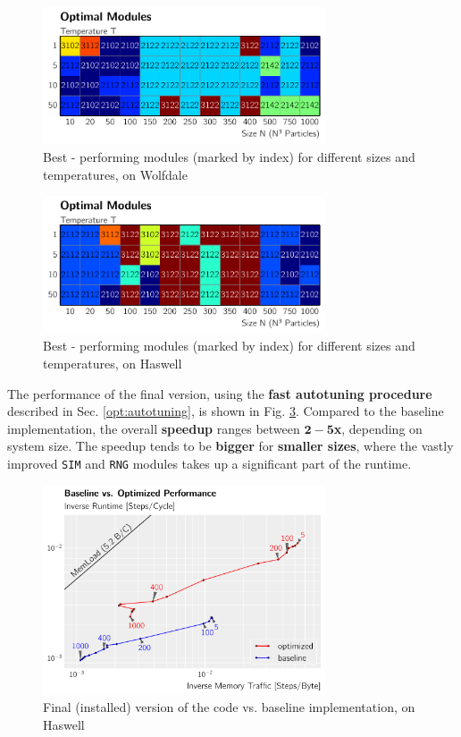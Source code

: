 \documentclass[letterpaper]{article}
\begin{document}
	\begin{figure}[h]\centering
	  \includegraphics[width = 8.36cm]{plots/module_msk2.pdf}
	  \caption{Best - performing modules (marked by index) for different sizes and temperatures, on Wolfdale}
	  \label{mod:Wolf}
	\end{figure}
	\begin{figure}[h]\centering
		  \includegraphics[width = 8.36cm]{plots/module_dg2.pdf}
		  \caption{Best - performing modules (marked by index) for different sizes and temperatures, on Haswell}
		  \label{mod,Has}
	\end{figure}\newline
The performance of the final version, using the \textbf{fast autotuning procedure} described in Sec. \ref{opt:autotuning}, is shown in Fig. \ref{roof:optvsbase}. Compared to the baseline implementation, the overall \textbf{speedup} ranges between \textbf{$\mathbf{2 - 5}$x}, depending on system size. The speedup tends to be \textbf{bigger} for \textbf{smaller sizes}, where the vastly improved \texttt{SIM} and \texttt{RNG} modules takes up a significant part of the runtime. 
	\begin{figure}[h]\centering
		  \includegraphics[width = 8.36cm]{plots/roofline_0.pdf}
		  \caption{Final (installed) version of the code vs.  baseline implementation, on Haswell}
		  \label{roof:optvsbase}
	\end{figure}
\end{document}
